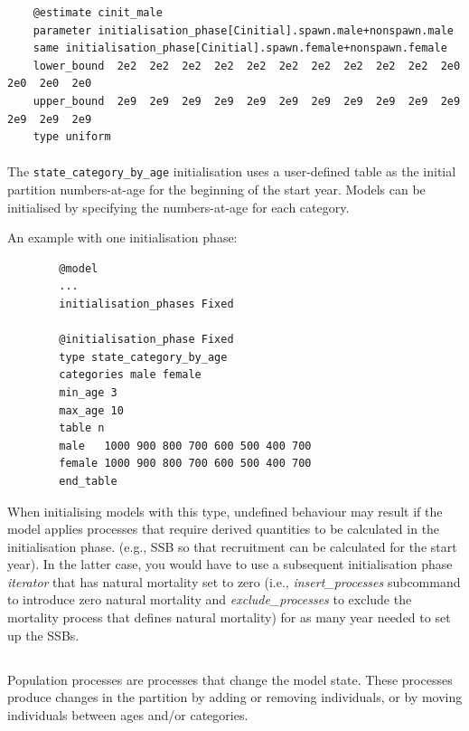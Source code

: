 {\small{\begin{verbatim}
	@estimate cinit_male
	parameter initialisation_phase[Cinitial].spawn.male+nonspawn.male
	same initialisation_phase[Cinitial].spawn.female+nonspawn.female
	lower_bound  2e2  2e2  2e2  2e2  2e2  2e2  2e2  2e2  2e2  2e2  2e0  2e0  2e0  2e0
	upper_bound  2e9  2e9  2e9  2e9  2e9  2e9  2e9  2e9  2e9  2e9  2e9  2e9  2e9  2e9
	type uniform
	\end{verbatim}}}

\paragraph{}\label{sec:InitialisationPhase-StateCategoryByAge} 

The \texttt{state\_category\_by\_age} initialisation uses a user-defined table as the initial partition numbers-at-age for the beginning of the  start year. Models can be initialised by specifying the numbers-at-age for each category.

An example with one initialisation phase:

{\small{\begin{verbatim}
		@model
		...
		initialisation_phases Fixed

		@initialisation_phase Fixed
		type state_category_by_age
		categories male female
		min_age 3
		max_age 10
		table n
		male   1000 900 800 700 600 500 400 700
		female 1000 900 800 700 600 500 400 700
		end_table
		\end{verbatim}}}

When initialising models with this type, undefined behaviour may result if the model applies processes that require derived quantities to be calculated in the initialisation phase. (e.g., SSB so that recruitment can be calculated for the start year). In the latter case, you would have to use a subsequent initialisation phase \textit{iterator} that has natural mortality set to zero (i.e., \textit{insert\_processes} subcommand to introduce zero natural mortality and \textit{exclude\_processes} to exclude the mortality process that defines natural mortality) for as many year needed to set up the SSBs.


\subsection{}\label{sec:Process}

Population processes are processes that change the model state. These processes produce changes in the partition by adding or removing individuals, or by moving individuals between ages and/or categories.


